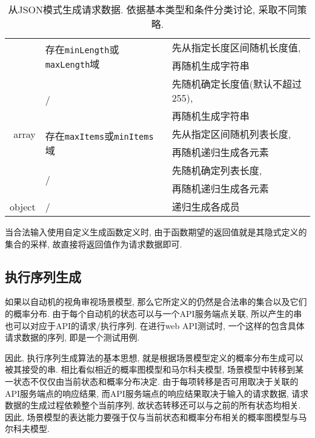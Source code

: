 \begin{table}[]
\begin{tabular}{rll}
                    \cline{2-3}
                    & \multirow{2}{*}{存在\texttt{minLength}或\texttt{maxLength}域} & 先从指定长度区间随机长度值, \\
                    & & 再随机生成字符串 \\
                    \cline{2-3}
                    & \multirow{2}{*}{/} & 先随机确定长度值(默认不超过255),\\
                    & & 再随机生成字符串 \\
                    \hline
                    array & \multirow{2}{*}{存在\texttt{maxItems}或\texttt{minItems}域} & 先从指定区间随机列表长度,\\
                    & & 再随机递归生成各元素 \\
                    \cline{2-3}
                    & \multirow{2}{*}{/} & 先随机确定列表长度,\\
                    & & 再随机递归生成各元素 \\
                    \hline
                    object & / & 递归生成各成员 \\
                    \bottomrule
                \end{tabular}
                \caption{从JSON模式生成请求数据. 依据基本类型和条件分类讨论, 采取不同策略.}
                \label{tab:schemagen}
            \end{table}
            
            当合法输入使用自定义生成函数定义时, 由于函数期望的返回值就是其隐式定义的集合的采样, 故直接将返回值作为请求数据即可.
        
        \subsection{执行序列生成}
            如果以自动机的视角审视场景模型, 那么它所定义的仍然是合法串的集合以及它们的概率分布. 由于每个自动机的状态可以与一个API服务端点关联, 所以产生的串也可以对应于API的请求/执行序列. 在进行web API测试时, 一个这样的包含具体请求数据的序列, 即是一个测试用例.
            
            因此, 执行序列生成算法的基本思想, 就是根据场景模型定义的概率分布生成可以被其接受的串. 相比看似相近的概率图模型和马尔科夫模型, 场景模型中转移到某一状态不仅仅由当前状态和概率分布决定. 由于每项转移是否可用取决于关联的API服务端点的响应结果, 而API服务端点的响应结果取决于输入的请求数据, 请求数据的生成过程依赖整个当前序列, 故状态转移还可以与之前的所有状态均相关. 因此, 场景模型的表达能力要强于仅与当前状态和概率分布相关的概率图模型与马尔科夫模型.
            
